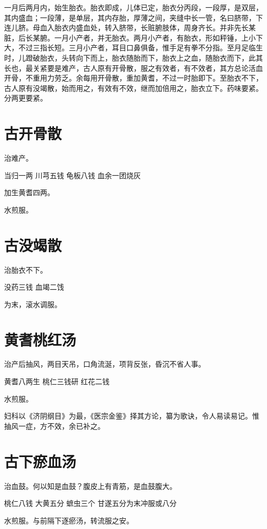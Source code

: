 \documentclass[a4paper,12pt,UTF8,twoside]{ctexbook}
\begin{document}
	一月后两月内，始生胎衣。胎衣即成，儿体已定，胎衣分丙段，一段厚，是双层，其内盛血；一段薄，是单层，其内存胎，厚薄之间，夹缝中长一管，名曰脐带，下连儿脐。母血入胎衣内盛血处，转入脐带，长赃腑肢体，周身齐长。并非先长某脏，后长某腑。一月小产者，并无胎衣。两月小产者，有胎衣，形如秤锤，上小下大，不过三指长短。三月小产者，耳目口鼻俱备，惟手足有拳不分指。至月足临生时，儿蹬破胎衣，头转向下而上，胎衣随胎而下，胎衣上之血，随胎衣而下，此其长也，最关紧要是难产，古人原有开骨散，服之有效者，有不效者，其方总论活血开骨，不重用力劳乏。余每用开骨散，重加黄耆，不过一时胎即下。至胎衣不下，古人原有没竭散，始而用之，有效有不效，继而加倍用之，胎衣立下。药味要紧。分两更要紧。
	
	\section{古开骨散}
	
	
	治难产。
	
	当归一两 川芎五钱 龟板八钱 血余一团烧灰
	
	加生黄耆四两。
	
	水煎服。
	
	\section{古没竭散}
	
	
	治胎衣不下。
	
	没药三钱 血竭二饯
	
	为末，滚水调服。
	
	\section{黄耆桃红汤}
	
	
	治产后抽风，两目天吊，口角流涎，项背反张，昏沉不省人事。
	
	黄耆八两生 桃仁三钱研 红花二钱
	
	水煎服。
	
	妇科以《济阴纲目》为最，《医宗金鉴》择其方论，纂为歌诀，令人易读易记。惟抽风一症，方不效，余已补之。
	
	\section{古下瘀血汤}
	
	
	治血鼓。何以知是血鼓？腹皮上有青筋，是血鼓腹大。
	
	桃仁八钱 大黄五分 蟅虫三个 甘遂五分为末冲服或八分
	
	水煎服。与前隔下逐瘀汤，转流服之安。
	
\end{document}
